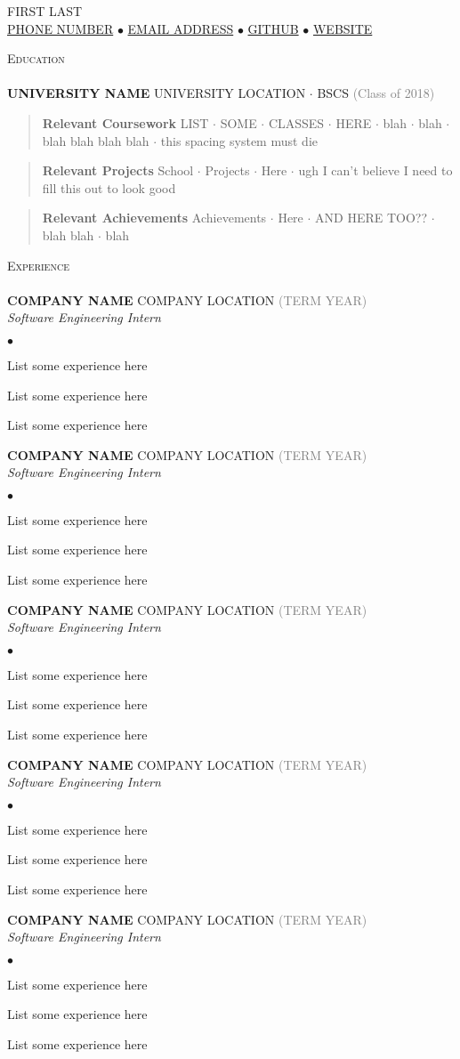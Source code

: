 \documentclass[12pt]{article}
\newcommand{\area}[2]{\vspace*{-14pt}\begin{verse}\textbf{#1}   #2 \end{verse}
  \vspace*{-4pt}}
\newcommand{\lineunder}{\vspace*{-8pt} \\ \hspace*{-18pt} \hrulefill \\}
\newcommand{\header}[1]{
  {\hspace*{-15pt}\vspace*{6pt} \textsc{#1}} \vspace*{-6pt} \lineunder
}
\newcommand{\fillpullright}[1]{\hfill \hfill \textcolor{Gray}{(#1)}}
\newcommand{\employer}[4]{{ \textbf{#1} #2 \fillpullright{#4}\\
    \textit{\fontsize{11}{12}\selectfont #3}\\  }}
\newcommand{\contact}[2]{
\vspace*{-8pt}
\begin{center}
{\LARGE \scshape {#1}}\\
#2
\end{center}
\vspace*{-8pt}
}
\newenvironment{achievements}{
  \begin{list}{$\bullet$}{\topsep 0pt \itemsep -4pt}
}{
  \vspace*{2pt}\end{list}
}
\newcommand{\schoolwithcourses}[5]{
  \textbf{#1} #2 $\cdot$ #3 #4 \fillpullright{#5}\\
  \vspace*{4pt}
}
\newcommand{\mailto}[1]{\href{mailto:#1}{#1}}
\def\lildot{$\cdot$ }
\begin{document}
\small
\smallskip
\vspace*{-44pt}

\contact{FIRST LAST}
        {\href{PHONE NUMBER LINK}{PHONE NUMBER} $\bullet$
        \mailto{EMAIL ADDRESS} $\bullet$
        \href{GITHUB URL}{GITHUB} $\bullet$
        \href{WEB URL}{WEBSITE}}

\header{Education}

\schoolwithcourses{UNIVERSITY NAME}{UNIVERSITY LOCATION}{BSCS}
                  {}{Class of 2018}
        \area{Relevant Coursework}{ LIST \lildot SOME
        \lildot CLASSES \lildot HERE \lildot blah \lildot blah \lildot blah
        blah blah blah \lildot this spacing system must die}
        \area{Relevant Projects}{ School \lildot Projects \lildot Here \lildot
        ugh I can't believe I need to fill this out to look good}
        \area{Relevant Achievements}{ Achievements \lildot Here \lildot AND
        HERE TOO?? \lildot blah blah \lildot blah}

\header{Experience}
\employer{COMPANY NAME}{COMPANY LOCATION}{Software Engineering Intern}{TERM YEAR}
        \begin{achievements}
        \item List some experience here
        \item List some experience here
        \item List some experience here
        \end{achievements}
\employer{COMPANY NAME}{COMPANY LOCATION}{Software Engineering Intern}{TERM YEAR}
        \begin{achievements}
        \item List some experience here
        \item List some experience here
        \item List some experience here
        \end{achievements}
\employer{COMPANY NAME}{COMPANY LOCATION}{Software Engineering Intern}{TERM YEAR}
        \begin{achievements}
        \item List some experience here
        \item List some experience here
        \item List some experience here
        \end{achievements}
\employer{COMPANY NAME}{COMPANY LOCATION}{Software Engineering Intern}{TERM YEAR}
        \begin{achievements}
        \item List some experience here
        \item List some experience here
        \item List some experience here
        \end{achievements}
\employer{COMPANY NAME}{COMPANY LOCATION}{Software Engineering Intern}{TERM YEAR}
        \begin{achievements}
        \item List some experience here
        \item List some experience here
        \item List some experience here
        \end{achievements}
\end{document}

